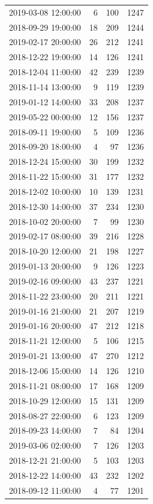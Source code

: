 \begin{tabular}{lrrr}
2019-03-08 12:00:00 & 6 & 100 & 1247 \\
2018-09-29 19:00:00 & 18 & 209 & 1244 \\
2019-02-17 20:00:00 & 26 & 212 & 1241 \\
2018-12-22 19:00:00 & 14 & 126 & 1241 \\
2018-12-04 11:00:00 & 42 & 239 & 1239 \\
2018-11-14 13:00:00 & 9 & 119 & 1239 \\
2019-01-12 14:00:00 & 33 & 208 & 1237 \\
2019-05-22 00:00:00 & 12 & 156 & 1237 \\
2018-09-11 19:00:00 & 5 & 109 & 1236 \\
2018-09-20 18:00:00 & 4 & 97 & 1236 \\
2018-12-24 15:00:00 & 30 & 199 & 1232 \\
2018-11-22 15:00:00 & 31 & 177 & 1232 \\
2018-12-02 10:00:00 & 10 & 139 & 1231 \\
2018-12-30 14:00:00 & 37 & 234 & 1230 \\
2018-10-02 20:00:00 & 7 & 99 & 1230 \\
2019-02-17 08:00:00 & 39 & 216 & 1228 \\
2018-10-20 12:00:00 & 21 & 198 & 1227 \\
2019-01-13 20:00:00 & 9 & 126 & 1223 \\
2019-02-16 09:00:00 & 43 & 237 & 1221 \\
2018-11-22 23:00:00 & 20 & 211 & 1221 \\
2019-01-16 21:00:00 & 21 & 207 & 1219 \\
2019-01-16 20:00:00 & 47 & 212 & 1218 \\
2018-11-21 12:00:00 & 5 & 106 & 1215 \\
2019-01-21 13:00:00 & 47 & 270 & 1212 \\
2018-12-06 15:00:00 & 14 & 126 & 1210 \\
2018-11-21 08:00:00 & 17 & 168 & 1209 \\
2018-10-29 12:00:00 & 15 & 131 & 1209 \\
2018-08-27 22:00:00 & 6 & 123 & 1209 \\
2018-09-23 14:00:00 & 7 & 84 & 1204 \\
2019-03-06 02:00:00 & 7 & 126 & 1203 \\
2018-12-21 21:00:00 & 5 & 103 & 1203 \\
2018-12-22 14:00:00 & 43 & 232 & 1202 \\
2018-09-12 11:00:00 & 4 & 77 & 1201 \\

\end{tabular}
